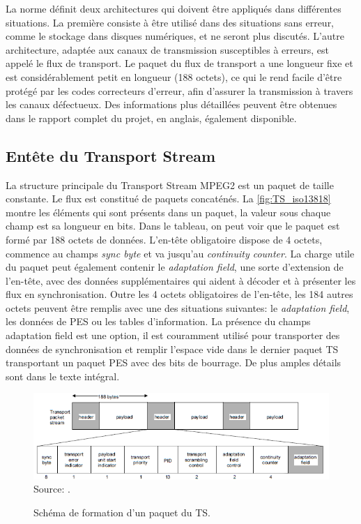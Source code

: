 \documentclass[12pt,a4paper]{article}
\begin{document}
La norme définit deux architectures qui doivent être appliqués dans différentes situations. La première consiste à être utilisé dans des situations sans erreur, comme le stockage dans disques numériques, et ne seront plus discutés. L'autre architecture, adaptée aux canaux de transmission susceptibles à erreurs, est appelé le flux de transport. Le paquet du flux de transport a une longueur fixe et est considérablement petit en longueur (188 octets), ce qui le rend facile d'être protégé par les codes correcteurs d'erreur, afin d'assurer la transmission à travers les canaux défectueux. Des informations plus détaillées peuvent être obtenues dans le rapport complet du projet, en anglais, également disponible.

\subsection{Entête du Transport Stream}
\label{ts_header}

La structure principale du Transport Stream MPEG2 est un paquet de taille constante. Le flux est constitué de paquets concaténés. La \autoref{fig:TS_iso13818} montre les éléments qui sont présents dans un paquet, la valeur sous chaque champ est sa longueur en bits. Dans le tableau, on peut voir que le paquet est formé par 188 octets de données. L'en-tête obligatoire dispose de 4 octets, commence au champs \textit{sync byte} et va jusqu'au \textit{continuity counter}. La charge utile du paquet peut également contenir le \textit{adaptation field}, une sorte d'extension de l'en-tête, avec des données supplémentaires qui aident à décoder et à présenter les flux en synchronisation. Outre les 4 octets obligatoires de l'en-tête, les 184 autres octets peuvent être remplis avec une des situations suivantes: le \textit{adaptation field}, les données de PES ou les tables d'information. La présence du champs adaptation field est une option, il est couramment utilisé pour transporter des données de synchronisation et remplir l'espace vide dans le dernier paquet TS transportant un paquet PES avec des bits de bourrage. De plus amples détails sont dans le texte intégral.

\begin{figure}[!h]
\centering
\caption{Schéma de formation d'un paquet du TS.}
\includegraphics[width=1\linewidth]{pictures/TS_iso13818.png}
\\Source: \cite[F.0.1]{ISO}.
\label{fig:TS_iso13818}
\end{figure}
\end{document}
